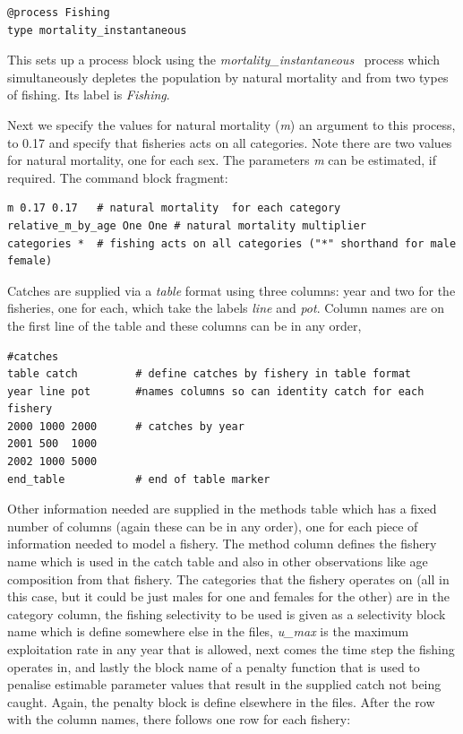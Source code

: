 {\small{\begin{verbatim}
@process Fishing
type mortality_instantaneous
\end{verbatim}}}

This sets up a process block using the \textit{mortality\_instantaneous}~ process which simultaneously depletes the population by natural mortality and from two types of fishing. Its label is \textit{Fishing}.

Next we specify the values for natural mortality (\textit{m}) an argument to this process, to 0.17 and specify that fisheries acts on all categories. Note there are two values for natural mortality, one for each sex. The parameters \textit{m} can be estimated, if required. The command block fragment:

{\small{\begin{verbatim}
m 0.17 0.17   # natural mortality  for each category
relative_m_by_age One One # natural mortality multiplier
categories *  # fishing acts on all categories ("*" shorthand for male female)
\end{verbatim}}}

Catches are supplied via a \textit{table} format using three columns: year and two for the fisheries, one for each, which take the labels \textit{line} and \textit{pot}. Column names are on the first line of the table and these columns can be in any order,

{\small{\begin{verbatim}
#catches
table catch         # define catches by fishery in table format
year line pot       #names columns so can identity catch for each fishery
2000 1000 2000      # catches by year
2001 500  1000
2002 1000 5000
end_table           # end of table marker
\end{verbatim}}}

Other information needed are supplied in the methods table which has a fixed number of columns (again these can be in any order), one for each piece of information needed to model a fishery. The method column defines the fishery name which is used in the catch table and also in other observations like age composition from that fishery. The categories that the fishery operates on (all in this case, but it could be just males for one and females for the other) are in the category column, the fishing selectivity to be used is given as a selectivity block name which is define somewhere else in the files, \textit{u\_max} is the maximum exploitation rate in any year that is allowed, next comes the time step the fishing operates in, and lastly the block name of a penalty function that is used to penalise estimable parameter values that result in the supplied catch not being caught. Again, the penalty block is define elsewhere in the files. After the row with the column names, there follows one row for each fishery:

